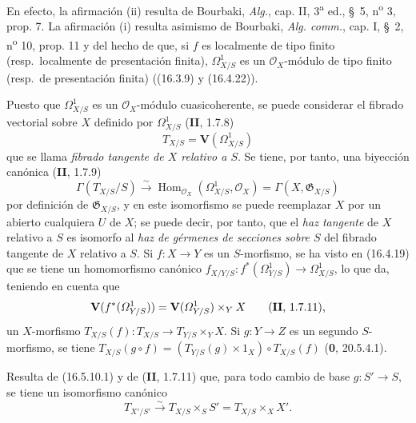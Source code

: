 En efecto, la afirmación (ii) resulta de Bourbaki, \emph{Alg.}, cap. II,
3\textsuperscript{a} ed., \S~5, n\textsuperscript{o} 3, prop. 7. La afirmación
(i) resulta asimismo de Bourbaki, \emph{Alg. comm.}, cap. I, \S~2,
n\textsuperscript{o} 10, prop. 11 y del hecho de que, si $f$ es localmente de tipo
finito (resp.\ localmente de presentación finita), $\varOmega_{X/S}^1$ es un
$\mathcal{O}_X$-módulo de tipo finito (resp.\ de presentación finita) ((16.3.9)
y (16.4.22)).

\begin{env}[16.5.12]
\label{IV.16.5.12}
Puesto que $\varOmega_{X/S}^1$ es un $\mathcal{O}_X$-módulo cuasicoherente, se puede
considerar el fibrado vectorial sobre $X$ definido por $\varOmega_{X/S}^1$
(\textbf{II}, 1.7.8)
\[
  T_{X/S}=\mathbf{V}(\varOmega_{X/S}^1)
  \tag{16.5.12.1}
  \label{IV.16.5.12.1}
\]
que se llama \emph{fibrado tangente de $X$ relativo a $S$}. Se tiene, por tanto, una
biyección canónica (\textbf{II}, 1.7.9)
\[
  \Gamma(T_{X/S}/S)\xrightarrow{\sim}
  \operatorname{Hom}_{\mathcal{O}_X}(\varOmega_{X/S}^1,\mathcal{O}_X)
  =\Gamma(X,\mathfrak{G}_{X/S})
\]
por definición de $\mathfrak{G}_{X/S}$, y en este isomorfismo se puede
reemplazar $X$ por un abierto cualquiera $U$ de $X$; se puede decir, por tanto, que el
\emph{haz tangente} de $X$ relativo a $S$ es isomorfo al
\emph{haz de gérmenes de secciones sobre $S$} del fibrado tangente de $X$
relativo a $S$. Si $f:X\to Y$ es un $S$-morfismo, se ha visto en (16.4.19)
que se tiene un homomorfismo canónico
$f_{X/Y/S}:f^*(\varOmega_{Y/S}^1)\to\varOmega_{X/S}^1$, lo que da, teniendo en cuenta
que
\[
  \mathbf{V}(f^*(\varOmega_{Y/S}^1))
  =\mathbf{V}(\varOmega_{Y/S}^1)\times_Y X\qquad\text{(\textbf{II}, 1.7.11),}
\]
un $X$-morfismo
$T_{X/S}(f):T_{X/S}\to T_{Y/S}\times_Y X$. Si $g:Y\to Z$ es un segundo
$S$-morfismo, se tiene
$T_{X/S}(g\circ f)=(T_{Y/S}(g)\times1_X)\circ T_{X/S}(f)$ (\textbf 0, 20.5.4.1).

Resulta de (16.5.10.1) y de (\textbf{II}, 1.7.11) que, para todo cambio de base
$g:S'\to S$, se tiene un isomorfismo canónico
\[
  T_{X'/S'}\xrightarrow{\sim}T_{X/S}\times_S S'
  =T_{X/S}\times_X X'.
  \tag{16.5.12.2}
  \label{IV.16.5.12.2}
\]
\end{env}

